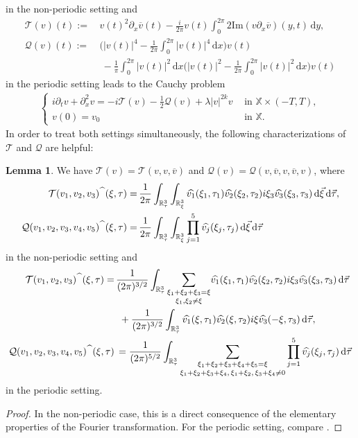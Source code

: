 \documentclass[reqno]{amsart}
\theoremstyle{Definitionl}
\theoremstyle{Definitionk}
\theoremstyle{definition}
\theoremstyle{Satzk}
\newtheorem{lemmak}[defi]{Lemma}
\theoremstyle{Satzl}
\theoremstyle{Bemerkung}
\begin{document}
in the non-periodic setting and
\begin{align*}
\mathcal T(v)(t):=&\, v(t)^2\partial_x\overline v(t)-\frac{i}{2\pi}v(t)\int_0^{2\pi}2\mathrm{Im}(v\partial_x\overline v)(y,t)\,\mathrm dy,\\
\mathcal Q(v)(t):=&\, \Big(|v(t)|^4-\frac{1}{2\pi}\int_0^{2\pi}|v(t)|^4\,\mathrm dx\Big)v(t)\\
&\,\ -\frac1\pi\int_0^{2\pi}|v(t)|^2\,\mathrm dx\Big(|v(t)|^2-\frac{1}{2\pi}\int_0^{2\pi}|v(t)|^2\,\mathrm dx\Big)v(t)
\end{align*}
in the periodic setting leads to the Cauchy problem
\begin{align}
\begin{cases}
i\partial_tv+\partial_x^2v= -i\mathcal T(v)-\frac12\mathcal Q(v)+\lambda|v|^{2k}v\ &\,\text{in }\mathbb X \times(-T,T),\\
v(0)= v_0\ &\,\text{in }\mathbb X.
\end{cases}\label{TP2}\end{align}
In order to treat both settings simultaneously, the following characterizations of $\mathcal T$ and $\mathcal Q$ are helpful:
\begin{lemmak}
We have $\mathcal T(v)=\mathcal T(v,v,\overline v)$ and $\mathcal Q(v)=\mathcal Q(v,\overline v,v,\overline v,v)$, where
\begin{align*}
\mathcal T(v_1,v_2,v_3)\widehat{\textcolor[rgb]{1,1,1}{f}}(\xi,\tau)=&\, \frac{1}{2\pi}\int_{\mathbb R^3_\tau}\int_{\mathbb R^3_\xi}\widehat{v_1}(\xi_1,\tau_1)\widehat{v_2}(\xi_2,\tau_2)i\xi_3\widehat{{v_3}}(\xi_3,\tau_3)\,\mathrm d\vec\xi\,\mathrm d\vec\tau,\\
\mathcal Q(v_1,v_2,v_3,v_4,v_5)\widehat{\textcolor[rgb]{1,1,1}{f}}(\xi,\tau)=&\, \frac{1}{2\pi}\int_{\mathbb R^3_\tau}\int_{\mathbb R^3_\xi}\prod_{j=1}^5\widehat{v_j}(\xi_j,\tau_j)\,\mathrm d\vec\xi\,\mathrm d\vec\tau
\end{align*}
in the non-periodic setting and
\begin{align*}
\mathcal T(v_1,v_2,v_3)\widehat{\textcolor[rgb]{1,1,1}{f}}(\xi,\tau)
=&\, \frac{1}{(2\pi)^{3/2}}\int_{\mathbb R^3_\tau}\underset{\xi_1,\xi_2\ne\xi}{\sum_{\xi_1+\xi_2+\xi_3=\xi}}\widehat{v_1}(\xi_1,\tau_1)\widehat{v_2}(\xi_2,\tau_2)i\xi_3\widehat{{v_3}}(\xi_3,\tau_3)\,\mathrm d\vec\tau\nonumber\\
&\,\ +\frac{1}{(2\pi)^{3/2}}\int_{\mathbb R^3_\tau}\widehat{v_1}(\xi,\tau_1)\widehat{v_2}(\xi,\tau_2)i\xi\widehat{{v_3}}(-\xi,\tau_3)\,\mathrm d\vec\tau,\\
\mathcal Q(v_1,v_2,v_3,v_4,v_5)\widehat{\textcolor[rgb]{1,1,1}{f}}(\xi,\tau)
&\,= \frac{1}{(2\pi)^{5/2}}\int_{\mathbb R^3_\tau}\underset{\xi_1+\xi_2+\xi_3+\xi_4,\,\xi_1+\xi_2,\,\xi_3+\xi_4\ne0}{\sum_{\xi_1+\xi_2+\xi_3+\xi_4+\xi_5=\xi}}\prod_{j=1}^5\widehat{v_j}(\xi_j,\tau_j)\,\mathrm d\vec\tau
\end{align*}
in the periodic setting.
\end{lemmak}
\begin{proof}
In the non-periodic case, this is a direct consequence of the elementary properties of the Fourier transformation. For the periodic setting, compare \cite[Lemma 6.4]{GH}.
\end{proof}
\end{document}
